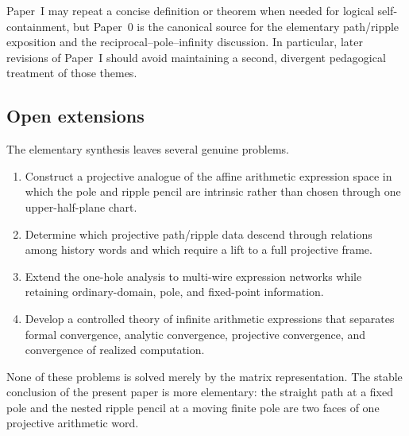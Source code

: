 Paper~I may repeat a concise definition or theorem when needed for logical
self-containment, but Paper~0 is the canonical source for the elementary
path/ripple exposition and the reciprocal--pole--infinity discussion.  In
particular, later revisions of Paper~I should avoid maintaining a second,
divergent pedagogical treatment of those themes.

\subsection{Open extensions}

The elementary synthesis leaves several genuine problems.

\begin{enumerate}
  \item Construct a projective analogue of the affine arithmetic expression
  space in which the pole and ripple pencil are intrinsic rather than chosen
  through one upper-half-plane chart.

  \item Determine which projective path/ripple data descend through relations
  among history words and which require a lift to a full projective frame.

  \item Extend the one-hole analysis to multi-wire expression networks while
  retaining ordinary-domain, pole, and fixed-point information.

  \item Develop a controlled theory of infinite arithmetic expressions that
  separates formal convergence, analytic convergence, projective convergence,
  and convergence of realized computation.
\end{enumerate}

None of these problems is solved merely by the matrix representation.  The
stable conclusion of the present paper is more elementary: the straight path
at a fixed pole and the nested ripple pencil at a moving finite pole are two
faces of one projective arithmetic word.
